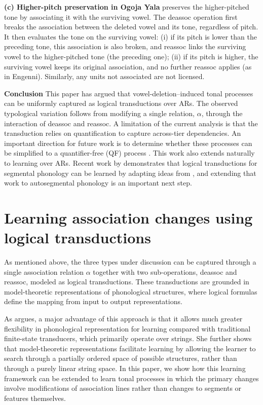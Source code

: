 \documentclass{article}[12pt]
\begin{document}
\textbf{(c) Higher-pitch preservation in Ogoja Yala} preserves the 
higher-pitched tone by associating it with the surviving vowel. The 
\textsf{deassoc} operation first breaks the association between the 
deleted vowel and its tone, regardless of pitch. It then evaluates the 
tone on the surviving vowel: (i) if its pitch is lower than the 
preceding tone, this association is also broken, and \textsf{reassoc} 
links the surviving vowel to the higher-pitched tone (the preceding 
one); (ii) if its pitch is higher, the surviving vowel keeps its 
original association, and no further \textsf{reassoc} applies (as in 
Engenni). Similarly, any units not associated are not licensed.

\textbf{Conclusion} This paper has argued that vowel-deletion–induced
tonal processes can be uniformly captured as logical transductions
over ARs. The observed typological variation follows from modifying a
single relation, $\alpha$, through the interaction of \textsf{deassoc}
and \textsf{reassoc}.  A limitation of the current analysis is that
the transduction relies on quantification to capture across-tier
dependencies. An important direction for future work is to determine
whether these processes can be simplified to a quantifier-free (QF)
process \citep{strother2018imdlawn, oakden2020notation}.  This work
also extends naturally to learning over ARs. Recent work by
\citet{yolyan2025logical} demonstrates that logical transductions for
segmental phonology can be learned by adapting ideas from
\citet{chandleeBufia2019}, and extending that work to autosegmental
phonology is an important next step.

\section{Learning association changes using logical transductions}
As mentioned above, the three types under discussion can be captured through a single association relation
\(\alpha\) together with two sub-operations, \textsf{deassoc} and
\textsf{reassoc}, modeled as logical transductions. These
transductions are grounded in model-theoretic representations of
phonological structures, where logical formulas define the mapping
from input to output representations.

As \citep{yolyan2025logical} argues, a major advantage of this approach
is that it allows much greater flexibility in phonological
representation for learning compared with traditional finite-state
transducers, which primarily operate over strings. She further shows
that model-theoretic representations facilitate learning by allowing
the learner to search through a partially ordered space of possible
structures, rather than through a purely linear string space.
In this paper, we show how this learning framework can be extended to
learn tonal processes in which the primary changes involve
modifications of association lines rather than changes to segments or
features themselves.
\end{document}
